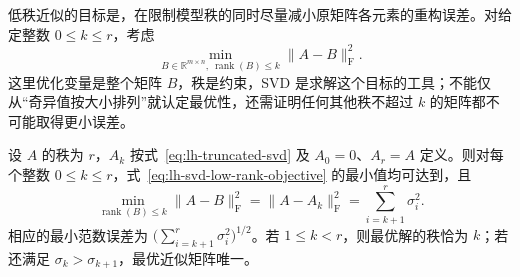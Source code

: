 低秩近似的目标是，在限制模型秩的同时尽量减小原矩阵各元素的重构误差。对给定整数 $0\leq k\leq r$，考虑
\begin{equation}
\min_{B\in\mathbb R^{m\times n},\ \operatorname{rank}(B)\leq k}
\|A-B\|_{\mathrm F}^2.
\label{eq:lh-svd-low-rank-objective}
\end{equation}
这里优化变量是整个矩阵 $B$，秩是约束，SVD 是求解这个目标的工具；不能仅从“奇异值按大小排列”就认定最优性，还需证明任何其他秩不超过 $k$ 的矩阵都不可能取得更小误差。

\begin{theorem}
\label{thm:lh-svd-best-approximation}
设 $A$ 的秩为 $r$，$A_k$ 按式~\eqref{eq:lh-truncated-svd} 及 $A_0=0$、$A_r=A$ 定义。则对每个整数 $0\leq k\leq r$，式~\eqref{eq:lh-svd-low-rank-objective} 的最小值均可达到，且
\begin{equation}
\min_{\operatorname{rank}(B)\leq k}\|A-B\|_{\mathrm F}^2
=\|A-A_k\|_{\mathrm F}^2
=\sum_{i=k+1}^r\sigma_i^2.
\label{eq:lh-svd-optimal-tail-error}
\end{equation}
相应的最小范数误差为 $\bigl(\sum_{i=k+1}^r\sigma_i^2\bigr)^{1/2}$。若 $1\leq k<r$，则最优解的秩恰为 $k$；若还满足 $\sigma_k>\sigma_{k+1}$，最优近似矩阵唯一。
\end{theorem}
